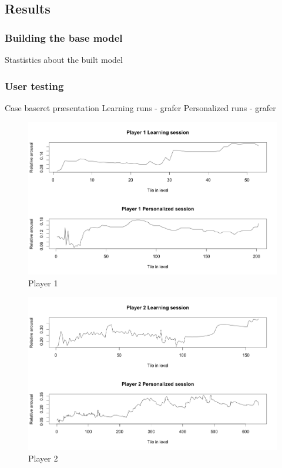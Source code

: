 \documentclass{llncs}
\begin{document}
\subsection{Results}
\subsubsection{Building the base model}
Stastistics about the built model

\subsubsection{User testing}
Case baseret præsentation
Learning runs - grafer
Personalized runs - grafer

\begin{figure}
\centering
\includegraphics[scale=0.4]{p1.png}
\caption{Player 1}
\label{fig:screenshot1}
\end{figure}
\begin{figure}
\centering
\includegraphics[scale=0.4]{p2.png}
\caption{Player 2}
\label{fig:screenshot1}
\end{figure}
\end{document}
